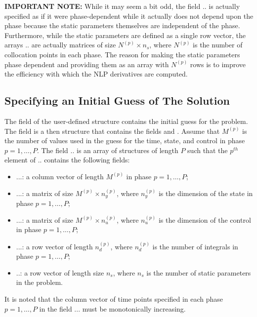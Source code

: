\documentclass[10pt]{article}
\newcommand{\bfblue}[1]{\textrm{{\color{blue}{\bf #1}}}}
\newcommand{\slred}[1]{\textrm{\color{red}{\sl #1}}}
\begin{document}
{\noindent}{\bf IMPORTANT NOTE:}  While it may seem a bit odd, the
field \slred{input}.\bfblue{phase($p$)}.\bfblue{parameter} is actually
specified as if it were phase-dependent while it actually does not
depend upon the phase because the static parameters themselves are
independent of the phase.  Furthermore, while the static parameters
are defined as a single row vector, the arrays
\slred{input}.\bfblue{phase($p$)}.\bfblue{parameter} are actually
matrices of size $N^{(p)}\times n_s$, where $N^{(p)}$ is the number of
collocation points in each phase.  The reason for making the static
parameters phase dependent and providing them as an array with
$N^{(p)}$ rows is to improve the efficiency with which the NLP
derivatives are computed.  

\subsection{Specifying an Initial Guess of The Solution \label{sect:guess}}

The field \bfblue{guess} of the user-defined structure \slred{setup} 
contains the initial guess for the problem.  The field \bfblue{guess}
is a then structure that contains the fields \bfblue{phase} and
\bfblue{parameter}.  Assume that $M^{(p)}$ is the number of values
used in the guess for the time, state, and control in phase
$p=1,\ldots,P$.  The field \slred{setup}.\bfblue{guess}.\bfblue{phase}
is an array of structures of length $P$ such that the $p^{th}$ element of
\slred{setup}.\bfblue{guess}.\bfblue{phase} contains the following
fields: 
\begin{itemize}
\item \slred{setup}.\bfblue{guess}.\bfblue{phase($p$)}.\bfblue{time}:
  a column vector of length $M^{(p)}$ in phase $p=1,\ldots,P$;
\item \slred{setup}.\bfblue{guess}.\bfblue{phase($p$)}.\bfblue{state}:
  a matrix of size $M^{(p)}\times n_y^{(p)}$, where $n_y^{(p)}$ is the
  dimension of the state in phase $p=1,\ldots,P$; 
\item \slred{setup}.\bfblue{guess}.\bfblue{phase($p$)}.\bfblue{control}:
 a matrix of size $M^{(p)}\times n_u^{(p)}$, where $n_u^{(p)}$  is the
 dimension of the control in phase $p=1,\ldots,P$;  
\item \slred{setup}.\bfblue{guess}.\bfblue{phase($p$)}.\bfblue{integral}:
 a row vector of length $n_d^{(p)}$, where $n_d^{(p)}$ is the number
 of integrals in phase $p=1,\ldots,P$; 
\item \slred{setup}.\bfblue{guess}.\bfblue{parameter}:  a row vector
  of length size $n_s$, where $n_s$ is the number of static parameters
  in the problem.  
\end{itemize}
It is noted that the column vector of time points specified in each 
phase $p=1,\ldots,P$ in the field
\slred{setup}.\bfblue{guess}.\bfblue{phase($p$)}.\bfblue{time} must be
monotonically increasing.  
\end{document}
